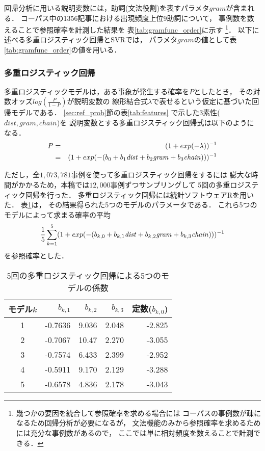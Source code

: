 回帰分析に用いる説明変数には，助詞(文法役割)を表すパラメタ$gram$が含まれる．
コーパス中の1356記事における出現頻度上位9助詞について，
事例数を数えることで参照確率を計測した結果を
表\ref{tab:gramfunc_order}に示す
\footnote{幾つかの要因を統合して参照確率を求める場合には
コーパスの事例数が疎になるため回帰分析が必要になるが，
文法機能のみから参照確率を求めるためには充分な事例数があるので，
ここでは単に相対頻度を数えることで計測できる．}．
以下に述べる多重ロジスティック回帰とSVRでは，
パラメタ$gram$の値として表\ref{tab:gramfunc_order}の値を用いる．

\subsubsection{多重ロジスティック回帰}

多重ロジスティックモデルは，ある事象が発生する確率を$P$としたとき，
その対数オッズ$log(\frac{P}{1-P})$が説明変数の
線形結合式$\lambda$で表せるという仮定に基づいた回帰モデルである．
\ref{sec:ref_prob}節の表\ref{tab:features}
で示した3素性($dist, gram, chain$)を
説明変数とする多重ロジスティック回帰式は以下のようになる．
\begin{eqnarray*}
P&=&(1+exp(-\lambda))^{-1}\\
&=&(1+exp(-(b_0 + b_1{\it dist} + b_2{\it gram} + b_3{\it chain})))^{-1}
\end{eqnarray*}

ただし，全$1,073,781$事例を使って多重ロジスティック回帰をするには
膨大な時間がかかるため，本稿では$12,000$事例ずつサンプリングして
5回の多重ロジスティック回帰を行った．
多重ロジスティック回帰には統計ソフトウェアR\cite{R}を用いた．
表\ref{tab:5logistic_models}は，
その結果得られた5つのモデルのパラメータである．
これら5つのモデルによって求まる確率の平均
$$\frac{1}{5} \sum_{k=1}^5 (1+exp(-(b_{k,0} + b_{k,1}{\it dist} + b_{k,2}{\it gram} + b_{k,3}{\it chain})))^{-1}$$
を参照確率とした．

\begin{table}
\begin{center}
\begin{tabular}{|c||r|r|r|r|}
\hline
モデル$k$&$b_{k,1}$&$b_{k,2}$&$b_{k,3}$&定数($b_{k,0}$)\\
\hline\hline
1&-0.7636&9.036&2.048&-2.825\\
2&-0.7067&10.47\phantom{0}&2.270&-3.055\\
3&-0.7574&6.433&2.399&-2.952\\
4&-0.5911&9.170&2.129&-3.288\\
5&-0.6578&4.836&2.178&-3.043\\
\hline
\end{tabular}
\end{center}
\caption{5回の多重ロジスティック回帰による5つのモデルの係数}
\label{tab:5logistic_models}
\end{table}



